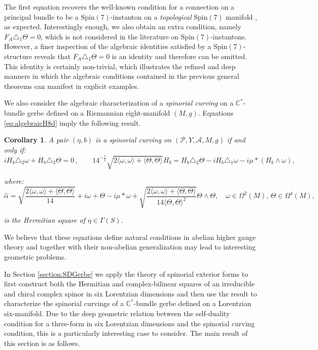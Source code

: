 \documentclass[10pt,a4paper,twoside,reqno]{amsart}
\theoremstyle{plain}
\newtheorem{cor}[thm]{Corollary}
\theoremstyle{definition}
\theoremstyle{remark}
\def\C{\mathbb{C}}
\def\Spin{\mathrm{Spin}}
\def\Spin{\mathrm{Spin}}
\def\cA{\mathcal{A}}
\def\cP{\mathcal{P}}
\def\cP{\mathcal{P}}
\newcommand{\escal}[1]{\langle#1\rangle}
\begin{document}
\noindent
The first equation recovers the well-known condition for a connection on a principal bundle to be a $\Spin(7)$-instanton on a \emph{topological} $\Spin(7)$ manifold \cite{Carrion}, as expected. Interestingly enough, we also obtain an extra condition, namely  $F_A\triangle_1 \Theta = 0$, which is not considered in the literature on $\Spin(7)$-instantons. However, a finer inspection of the algebraic identities satisfied by a $\Spin(7)$-structure reveals that $F_A\triangle_1 \Theta = 0$ is an identity and therefore can be omitted. This identity is certainly non-trivial, which illustrates the refined and deep manners in which the algebraic conditions contained in the previous general theorems can manifest in explicit examples.  \medskip

We also consider the algebraic characterization of a \emph{spinorial curving} on a $\C^{\ast}$-bundle gerbe defined on a Riemannian eight-manifold $(M,g)$. Equations \eqref{eq:algebraicH8d} imply the following result.

\begin{cor}
A pair $(\eta,b)$ is a spinorial curving on $(\cP, Y, \cA,M,g)$ if and only if:
\begin{equation*}
i H_b \triangle_2 \omega + H_b \triangle_3 \Theta = 0\, , \qquad 14^{-\frac{1}{2}}\sqrt{ 2\escal{\omega,\omega}+\escal{\Theta,\Theta}} H_b = H_b\triangle_2 \Theta  -  i H_b \triangle_1 \omega    -  i \mu \ast (H_b\wedge \omega),
\end{equation*}

\noindent
where:
\begin{equation*}
\widehat{\alpha} = \sqrt{\frac{2\escal{\omega,\omega}+\escal{\Theta,\Theta}}{14}} + i\omega + \Theta-i\mu*\omega +  \sqrt{\frac{2\escal{\omega,\omega}+\escal{\Theta,\Theta}}{14 \escal{\Theta,\Theta}^2 }}\Theta \wedge \Theta,\quad \omega\in\Omega^2(M),\,\Theta\in\Omega^4(M),
\end{equation*}

\noindent
is the Hermitian square of $\eta\in\Gamma(S)$.
\end{cor}

\noindent
We believe that these equations define natural conditions in abelian higher gauge theory and together with their non-abelian generalization may lead to interesting geometric problems.\medskip

In Section \ref{section:SDGerbe} we apply the theory of spinorial exterior forms to first construct both the Hermitian and complex-bilinear squares of an irreducible and chiral complex spinor in six Lorentzian dimensions and then use the result to characterize the spinorial curvings of a $\mathbb{C}^{\ast}$-bundle gerbe defined on a Lorentzian six-manifold. Due to the deep geometric relation between the self-duality condition for a three-form in six Lorentzian dimensions and the spinorial curving condition, this is a particularly interesting case to consider. The main result of this section is as follows.
\end{document}
